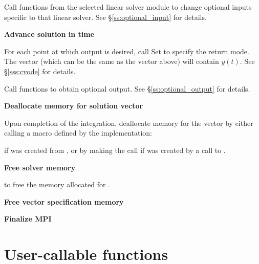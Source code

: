 \begin{Steps}
  Call  functions from the selected linear solver module to
  change optional inputs specific to that linear solver.
  See \S\ref{ss:optional_input} for details.

\item
  {\bf Advance solution in time}

  For each point at which output is desired, call
  Set  to specify the return mode.
  The vector  (which can be the same as
  the vector  above) will contain $y(t)$.
  See \S\ref{sss:cvode} for details.
  
\item
  Call  functions to obtain optional output.
  See \S\ref{ss:optional_output} for details.

\item
  {\bf Deallocate memory for solution vector}

  Upon completion of the integration, deallocate memory for the vector 
  by either calling a macro defined by the {\nvector} implementation:

  {\s} 

  {\p} 

  if  was created from , or by making the call 
   if  was created by a call to .
  
\item
  {\bf Free solver memory}

   to free the memory allocated for {\cvode}.
  
\item
  {\bf Free vector specification memory}

  {\s} 

  {\p} 

\item 
  {\bf {\p} Finalize MPI}
  
\end{Steps}

\section{User-callable functions}
\label{ss:cvode_fct_sim}

